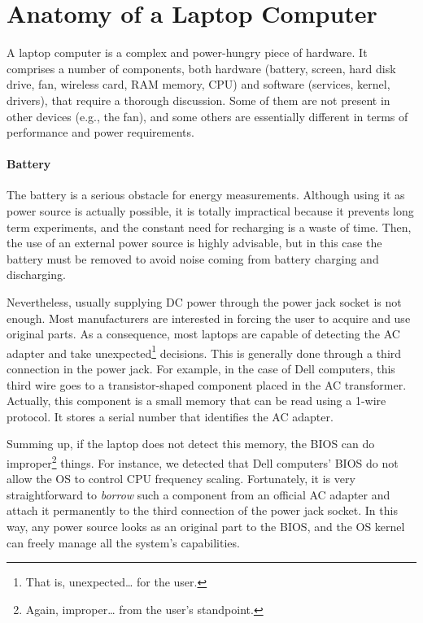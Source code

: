 \documentclass[twoside,nohyper]{tufte-book}
\theoremstyle{definition}
\theoremstyle{definition}
\theoremstyle{definition}
\theoremstyle{remark}
\begin{document}
\section{Anatomy of a Laptop
Computer}\label{anatomy-of-a-laptop-computer}

A laptop computer is a complex and power-hungry piece of hardware. It
comprises a number of components, both hardware (battery, screen, hard
disk drive, fan, wireless card, RAM memory, CPU) and software (services,
kernel, drivers), that require a thorough discussion. Some of them are
not present in other devices (e.g., the fan), and some others are
essentially different in terms of performance and power requirements.

\paragraph{Battery}\label{battery}

The battery is a serious obstacle for energy measurements. Although
using it as power source is actually possible, it is totally impractical
because it prevents long term experiments, and the constant need for
recharging is a waste of time. Then, the use of an external power source
is highly advisable, but in this case the battery must be removed to
avoid noise coming from battery charging and discharging.

Nevertheless, usually supplying DC power through the power jack socket
is not enough. Most manufacturers are interested in forcing the user to
acquire and use original parts. As a consequence, most laptops are
capable of detecting the AC adapter and take unexpected\footnote{That
  is, unexpected\ldots{} for the user.} decisions. This is generally
done through a third connection in the power jack. For example, in the
case of Dell computers, this third wire goes to a transistor-shaped
component placed in the AC transformer. Actually, this component is a
small memory that can be read using a 1-wire protocol. It stores a
serial number that identifies the AC adapter.

Summing up, if the laptop does not detect this memory, the BIOS can do
improper\footnote{Again, improper\ldots{} from the user's standpoint.}
things. For instance, we detected that Dell computers' BIOS do not allow
the OS to control CPU frequency scaling. Fortunately, it is very
straightforward to \emph{borrow} such a component from an official AC
adapter and attach it permanently to the third connection of the power
jack socket. In this way, any power source looks as an original part to
the BIOS, and the OS kernel can freely manage all the system's
capabilities.
\end{document}
